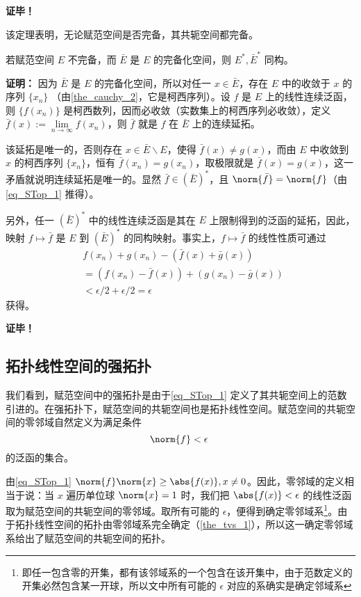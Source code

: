 \textbf{证毕！}

该定理表明，无论赋范空间是否完备，其共轭空间都完备。

\begin{theorem}{}
若赋范空间 $E$ 不完备，而 $\bar{E}$ 是 $E$ 的完备化空间，则 $E^*,\bar{E}^*$ 同构。
\end{theorem}

\textbf{证明：} 因为 $\bar{E}$ 是 $E$ 的完备化空间，所以对任一 $x\in \bar{E}$，存在 $E$ 中的收敛于 $x$ 的序列 $\{x_n\}$ （由\autoref{the_cauchy_2}，它是柯西序列）。设 $f$ 是 $E$ 上的线性连续泛函，则 $\{f(x_n)\}$ 是柯西数列，因而必收敛（实数集上的柯西序列必收敛），定义 $\bar f(x):=\lim\limits_{n\rightarrow\infty}f(x_n)$，则 $\bar f$ 就是 $f$ 在 $\bar E$ 上的连续延拓。

该延拓是唯一的，否则存在 $x\in \bar E\backslash E$，使得 $\bar f(x)\neq g(x)$，而由 $E$ 中收敛到 $x$ 的柯西序列 $\{x_n\}$，恒有 $\bar f(x_n)=g(x_n)$，取极限就是 $\bar f(x)=g(x)$，这一矛盾就说明连续延拓是唯一的。显然 $\bar f\in(\bar E)^*$，且 $\norm{\bar f}=\norm{f}$（由\autoref{eq_STop_1} 推得）。

另外，任一 $(\bar E)^*$ 中的线性连续泛函是其在 $E$ 上限制得到的泛函的延拓，因此，映射 $f\mapsto\bar f$ 是 $E$ 到 $(\bar E)^*$ 的同构映射。事实上，$f\mapsto\bar f$ 的线性性质可通过 
\begin{equation}
\begin{aligned}
&f(x_n)+g(x_n)-(\bar f(x)+\bar g(x))\\
&=(f(x_n)-\bar f(x))+(g(x_n)-\bar g(x))\\
&<\epsilon/2+\epsilon/2=\epsilon
\end{aligned}~
\end{equation}
获得。

\textbf{证毕！}



\subsection{拓扑线性空间的强拓扑}

我们看到，赋范空间中的强拓扑是由于\autoref{eq_STop_1} 定义了其共轭空间上的范数引进的。在强拓扑下，赋范空间的共轭空间也是拓扑线性空间。赋范空间的共轭空间的零邻域自然定义为满足条件
\begin{equation}
\norm{f}<\epsilon~
\end{equation}
的泛函的集合。

由\autoref{eq_STop_1} $\norm{f}\norm{x}\geq\abs{f(x)},x\neq0$。因此，零邻域的定义相当于说：当 $x$ 遍历单位球 $\norm{x}=1$ 时，我们把 $\abs{f(x)}<\epsilon$ 的线性泛函取为赋范空间的共轭空间的零邻域。取所有可能的 $\epsilon$，便得到确定零邻域系\footnote{即任一包含零的开集，都有该邻域系的一个包含在该开集中，由于范数定义的开集必然包含某一开球，所以文中所有可能的 $\epsilon$ 对应的系确实是确定邻域系}。由于拓扑线性空间的拓扑由零邻域系完全确定（\autoref{the_tvs_1}），所以这一确定零邻域系给出了赋范空间的共轭空间的拓扑。

